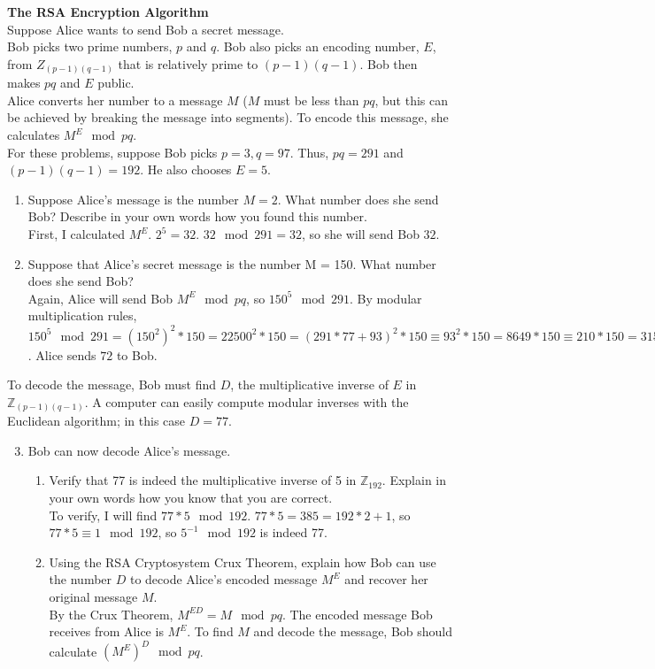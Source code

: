 \documentclass{article}
\begin{document}
\textbf{The RSA Encryption Algorithm}\\ 
Suppose Alice wants to send Bob a secret message.\\
Bob picks two prime numbers, $p$ and $q$. Bob also picks an encoding number, $E$, from $Z_{(p-1)(q-1)}$ that is relatively prime to $(p-1)(q-1)$. Bob then makes $pq$ and $E$ public.\\
Alice converts her number to a message $M$ ($M$ must be less than $pq$, but this can be achieved by breaking the message into segments). To encode this message, she calculates $M^{E} \mod{pq}$. \vspace{8pt}\\ 
For these problems, suppose Bob picks $p = 3, q = 97$. Thus, $pq = 291$ and $(p-1)(q-1) = 192$. He also chooses $E = 5$.
\begin{enumerate}
    \item Suppose Alice's message is the number $M = 2$. What number does she send Bob? Describe in your own words how you found this number.\\
    First, I calculated $M^{E}$. $2^{5} = 32$. $32 \mod{291} = 32$, so she will send Bob $32$.
    \item Suppose that Alice’s secret message is the number M = 150. What number does she send Bob?\\
    Again, Alice will send Bob $M^{E} \mod{pq}$, so $150^{5} \mod 291$. By modular multiplication rules, $150^{5} \mod{291} = (150^{2})^{2}*150 = 22500^{2} * 150 = (291*77 + 93)^{2} * 150 \equiv 93^2 * 150 = 8649 * 150 \equiv 210 * 150 = 31500 \equiv 72 \mod{291}$. Alice sends $72$ to Bob.
\end{enumerate}
To decode the message, Bob must find $D$, the multiplicative inverse of $E$ in $\mathbb{Z}_{(p-1)(q-1)}$. A computer can easily compute modular inverses with the Euclidean algorithm; in this case $D=77$.
\begin{enumerate}
\setcounter{enumi}{2}
    \item Bob can now decode Alice's message.
    \begin{enumerate}
        \item Verify that 77 is indeed the multiplicative inverse of 5 in $\mathbb{Z}_{192}$. Explain in your own words how you know that you are correct.\\
        To verify, I will find $77 * 5 \mod{192}$. $77*5 = 385 = 192*2 + 1$, so $77 * 5 \equiv 1 \mod{192}$, so $5^{-1} \mod{192}$ is indeed 77.
        \item Using the RSA Cryptosystem Crux Theorem, explain how Bob can use the number $D$ to decode Alice’s encoded message $M^E$ and recover her original message $M$.\\
        By the Crux Theorem, $M^{ED} = M \mod{pq}$. The encoded message Bob receives from Alice is $M^{E}$. To find $M$ and decode the message, Bob should calculate $(M^{E})^{D} \mod{pq}$.
    \end{enumerate}
\end{enumerate}
\end{document}
